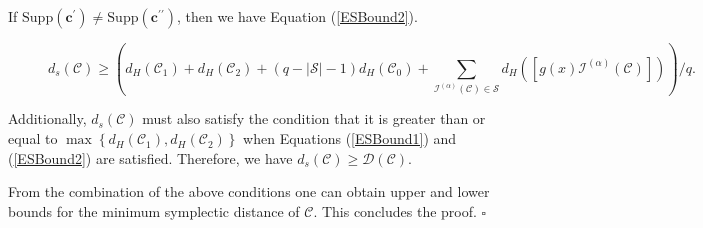 \documentclass[journal]{IEEEtran}
\newenvironment{proof}{{\noindent\it Proof:} }{\hfill $\square$\par}
\newtheorem{example}{Example}
\begin{document}
\begin{proof}
If $\mathrm{Supp}(\mathbf{c}^{\prime})\ne \mathrm{Supp}(\mathbf{c}^{\prime\prime})$, then we have Equation (\ref{ESBound2}). 
\begin{figure}\begin{equation}\label{ESBound2}
d_s(\mathscr{C})\ge \left(d_H(\mathscr{C}_1)+d_H(\mathscr{C}_2)+(q-|\mathcal{S} |-1)d_H(\mathscr{C}_0)+\sum\limits_{\mathcal{I}^{(\alpha)}(\mathscr{C})\in \mathcal{S} } d_H\left(\left[ g(x)\mathcal{I}^{(\alpha)}(\mathscr{C}) \right]\right)\right)/ q.
\end{equation}\end{figure}

Additionally, $d_s(\mathscr{C})$ must also satisfy the condition that it is greater than or equal to $\max\left\{ d_H(\mathscr{C}_1),d_H(\mathscr{C}_2) \right\}$ when Equations (\ref{ESBound1}) and (\ref{ESBound2}) are satisfied. 
Therefore, we have $d_s(\mathscr{C})\ge\mathcal{D}(\mathscr{C})$.

From the combination of the above conditions one can obtain upper and lower bounds for the minimum symplectic distance of $\mathscr{C}$. This concludes the proof.
\end{proof}

\end{document}

